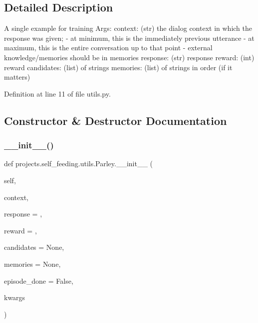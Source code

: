 \subsection{Detailed Description}
\begin{DoxyVerb}A single example for training
Args:
    context: (str) the dialog context in which the response was given;
        - at minimum, this is the immediately previous utterance
        - at maximum, this is the entire conversation up to that point
        - external knowledge/memories should be in memories
    response: (str) response
    reward: (int) reward
    candidates: (list) of strings
    memories: (list) of strings in order (if it matters)
\end{DoxyVerb}
 

Definition at line 11 of file utils.\+py.



\subsection{Constructor \& Destructor Documentation}
\mbox{\label{classprojects_1_1self__feeding_1_1utils_1_1Parley_a6b92aa6bd0af5dd096ae189408b3ad77}} 
\subsubsection{\texorpdfstring{\+\_\+\+\_\+init\+\_\+\+\_\+()}{\_\_init\_\_()}}
{\footnotesize\ttfamily def projects.\+self\+\_\+feeding.\+utils.\+Parley.\+\_\+\+\_\+init\+\_\+\+\_\+ (\begin{DoxyParamCaption}\item[{}]{self,  }\item[{}]{context,  }\item[{}]{response = {\ttfamily \textquotesingle{}\textquotesingle{}},  }\item[{}]{reward = {},  }\item[{}]{candidates = {\ttfamily None},  }\item[{}]{memories = {\ttfamily None},  }\item[{}]{episode\+\_\+done = {\ttfamily False},  }\item[{}]{kwargs }\end{DoxyParamCaption})}



